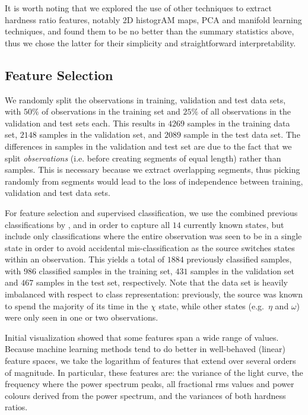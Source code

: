 \documentclass[12pt]{emulateapj}
\begin{document}
It is worth noting that we explored the use of other techniques to extract hardness ratio features, notably 2D histogrAM maps, PCA and manifold learning techniques, and found them to be no better than the summary statistics above, thus we chose the latter for their simplicity and straightforward interpretability. 


\subsection{Feature Selection}
\label{sec:featureselection}

We randomly split the observations in training, validation and test data sets, with $50\%$ of observations in the training set and $25\%$ of all observations in the validation and test sets each. This results in $4269$ samples in the training data set, $2148$ samples in the validation set, and $2089$ sample in the test data set.  The differences in samples in the validation and test set are due to the fact that we split \textit{observations} (i.e. before creating segments of equal length) rather than samples. This is necessary because we extract overlapping segments, thus picking randomly from segments would lead to the loss of independence between training, validation and test data sets. 

For feature selection and supervised classification, we use the combined previous classifications by \citet{belloni2000}, \citet{kleinwolt2002} and \citet{hannikainen2003} in order to capture all $14$ currently known states, but include only classifications where the entire observation was seen to be in a single state in order to avoid accidental mis-classification as the source switches states within an observation. This yields a total of $1884$ previously classified samples, with $986$ classified samples in the training set, $431$ samples in the validation set and $467$ samples in the test set, respectively. Note that the data set is heavily imbalanced with respect to class representation: previously, the source was known to spend the majority of its time in the $\chi$ state, while other states (e.g.\ $\eta$ and $\omega$) were only seen in one or two observations. 

Initial visualization showed that some features span a wide range of values. Because machine learning methods tend to do better in well-behaved (linear) feature spaces, we take the logarithm of features that extend over several orders of magnitude. In particular, these features are: the variance of the light curve, the frequency where the power spectrum peaks, all fractional rms values and power colours derived from the power spectrum, and the variances of both hardness ratios. 
\end{document}
